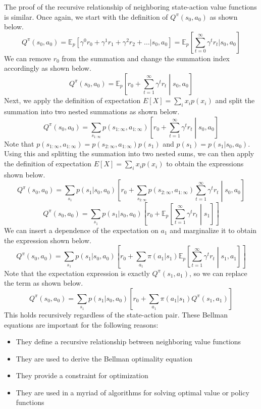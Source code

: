 \documentclass[11pt]{article}
\begin{document}
The proof of the recursive relationship of neighboring state-action value functions is similar. Once again, we start with the definition of $Q^\pi(s_0, a_0)$ as shown below.
\[ Q^\pi(s_0,a_0) = \mathds{E}_p [\gamma^0 r_0 + \gamma^1 r_1 + \gamma^2 r_2 + \dots | s_0,a_0] = \mathds{E}_p \left[\sum_{t=0}^\infty \gamma^tr_t|s_0, a_0 \right] \]
We can remove $r_0$ from the summation and change the summation index accordingly as shown below.
\[ Q^\pi(s_0,a_0) = \mathds{E}_p \left[r_0 + \sum_{t=1}^\infty \gamma^tr_t\middle|s_0, a_0 \right] \]
Next, we apply the definition of expectation $E[X] = \sum_i x_ip(x_i)$ and split the summation into two nested summations as shown below.
\[ Q^\pi(s_0,a_0) = \sum_{s_{1:\infty}} p(s_{1:\infty},a_{1:\infty}) \left[r_0 + \sum_{t=1}^\infty \gamma^tr_t\middle|s_0, a_0 \right] \]
Note that $p(s_{1:\infty},a_{1:\infty}) = p(s_{2:\infty},a_{1:\infty})p(s_{1})$ and $p(s_{1}) = p(s_{1}|s_0, a_0)$. Using this and splitting the summation into two nested sums, we can then apply the definition of expectation $E[X] = \sum_i x_ip(x_i)$ to obtain the expressions shown below.
\[ Q^\pi(s_0,a_0) = \sum_{s_{1}} p(s_{1}|s_0, a_{0}) \left[r_0 + \sum_{s_{2:\infty}} p(s_{2:\infty},a_{1:\infty})\sum_{t=1}^\infty \gamma^tr_t\middle|s_0, a_0 \right] \]
\[ Q^\pi(s_0,a_0) = \sum_{s_{1}} p(s_{1}|s_0, a_{0}) \left[r_0 + \mathds{E}_p\left[\sum_{t=1}^\infty \gamma^tr_t\middle|s_1 \right] \right] \]
We can insert a dependence of the expectation on $a_1$ and marginalize it to obtain the expression shown below.
\[ Q^\pi(s_0,a_0) = \sum_{s_{1}} p(s_{1}|s_0, a_{0}) \left[r_0 + \sum_{a_1}\pi(a_1|s_1)\mathds{E}_p\left[\sum_{t=1}^\infty \gamma^tr_t\middle|s_1, a_1 \right] \right] \]
Note that the expectation expression is exactly $Q^\pi(s_1, a_1)$, so we can replace the term as shown below.
\[ Q^\pi(s_0,a_0) = \sum_{s_{1}} p(s_{1}|s_0, a_{0}) \left[r_0 + \sum_{a_1}\pi(a_1|s_1)Q^\pi(s_1, a_1) \right] \]
This holds recursively regardless of the state-action pair.
These Bellman equations are important for the following reasons:
\begin{itemize}
    \item They define a recursive relationship between neighboring value functions
    \item They are used to derive the Bellman optimality equation
    \item They provide a constraint for optimization
    \item They are used in a myriad of algorithms for solving optimal value or policy functions
\end{itemize}
\end{document}
